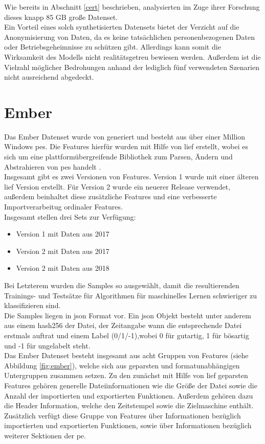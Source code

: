 \documentclass[
    12pt, %
    DIV10,
    ngerman, %
    a4paper, %
    oneside, %
    titlepage, %
    parskip=half, %
    headings=normal, %
    listof=totoc, %
    bibliography=totoc, %
    index=totoc, %
    captions=tableheading, %
    final %
]{scrreprt}
\begin{document}
Wie bereits in Abschnitt \ref{cert} beschrieben, analysierten \textcite{Le2019} im Zuge ihrer Forschung dieses knapp 85 GB große Datenset.\\
Ein Vorteil eines solch synthetisierten Datensets bietet der Verzicht auf die Anonymisierung von Daten, da es keine tatsächlichen personenbezogenen Daten oder Betriebsgeheimnisse zu schützen gibt. Allerdings kann somit die Wirksamkeit des Modells nicht realitätsgetreu bewiesen werden. Außerdem ist die Vielzahl möglicher Bedrohungen anhand der lediglich fünf verwendeten Szenarien nicht ausreichend abgedeckt.
\section{Ember}
Das Ember Datenset wurde von \textcite{anderson2018ember} generiert und besteht aus über einer Million Windows \ac{pes}. Die Features hierfür wurden mit Hilfe von \ac{lief} erstellt, wobei es sich um eine plattformübergreifende Bibliothek zum Parsen, Ändern und Abstrahieren von \ac{pes} handelt \parencite{Quarkslab}.\\
Insgesamt gibt es zwei Versionen von Features. Version 1 wurde mit einer älteren \ac{lief} Version erstellt. Für Version 2 wurde ein neuerer Release verwendet, außerdem beinhaltet diese zusätzliche Features und eine verbesserte Importverarbeitug ordinaler Features.\\
Insgesamt stellen \citeauthor{anderson2018ember} drei Sets zur Verfügung:
\begin{itemize}
\item Version 1 mit Daten aus 2017
\item Version 2 mit Daten aus 2017
\item Version 2 mit Daten aus 2018
\end{itemize}
Bei Letzterem wurden die Samples so ausgewählt, damit die resultierenden Trainings- und Testsätze für Algorithmen für maschinelles Lernen schwieriger zu klassifizieren sind.\\
Die Samples liegen in \ac{json} Format vor. Ein \ac{json} Objekt besteht unter anderem aus einem hash256 der Datei, der Zeitangabe wann die entsprechende Datei erstmals auftrat und einem Label (0/1/-1),wobei 0 für gutartig, 1 für bösartig und -1 für ungelabelt steht.\\
Das Ember Datenset besteht insgesamt aus acht Gruppen von Features (siehe Abbildung \ref{fig:ember}), welche sich aus geparsten und formatunabhängigen Untergruppen zusammen setzen. Zu den zunächst mit Hilfe von \ac{lief} geparsten Features gehören generelle Dateiinformationen wie die Größe der Datei sowie die Anzahl der importierten und exportierten Funktionen. Außerdem gehören dazu die Header Information, welche den Zeitstempel sowie die Zielmaschine enthält. Zusätzlich verfügt diese Gruppe von Features über Informationen bezüglich importierten und exportierten Funktionen, sowie über Informationen bezüglich weiterer Sektionen der \ac{pe}.
\end{document}
